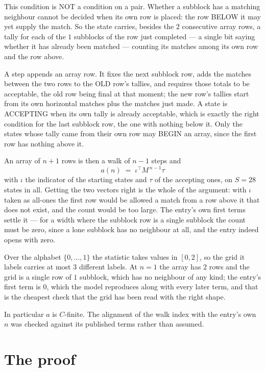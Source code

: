 \documentclass[11pt,a4paper]{article}
\theoremstyle{plain}
\theoremstyle{definition}
\begin{document}
This condition is NOT a condition on a pair. Whether a subblock has a
matching neighbour cannot be decided when its own row is placed: the row BELOW it may yet
supply the match. So the state carries, besides the $2$ consecutive array rows, a tally for
each of the $1$ subblocks of the row just completed --- a single bit saying whether it has already been matched --- counting its matches
among its own row and the row above.

A step appends an array row. It fixes the next subblock row, adds the matches between the two
rows to the OLD row's tallies, and requires those totals to be acceptable, the old row being
final at that moment; the new row's tallies start from its own horizontal matches plus the
matches just made. A state is ACCEPTING when its own tally is already acceptable, which is
exactly the right condition for the last subblock row, the one with nothing below it. Only the
states whose tally came from their own row may BEGIN an array, since the first row has nothing
above it.

An array of $n+1$ rows is then a walk of $n-1$ steps and
\[
a(n)\;=\;\iota^{\!\top}M^{\,n-1}\tau
\]
with $\iota$ the indicator of the starting states and $\tau$ of the accepting ones, on
$S=28$ states in all. Getting the two vectors right is the whole of the argument: with
$\iota$ taken as all-ones the first row would be allowed a match from a row above it that does
not exist, and the count would be too large. The entry's own first terms settle it --- for
a width where the subblock row is a single subblock
the count must be zero, since a lone subblock has no neighbour at all, and the entry indeed opens with zero.

Over the alphabet $\{0,\dots,1\}$ the statistic takes values in $[0,2]$, so the
grid it labels carries at most $3$ different labels. At $n=1$ the array has $2$
rows and the grid is a single row of $1$
subblock, which has no neighbour of any kind; the entry's first term is
$0$, which the model reproduces along with every later term, and that is the cheapest
check that the grid has been read with the right shape.

In particular $a$ is $C$-finite. The alignment of the walk index with the entry's own $n$ was
checked against its published terms rather than assumed.

\section{The proof}
\end{document}
